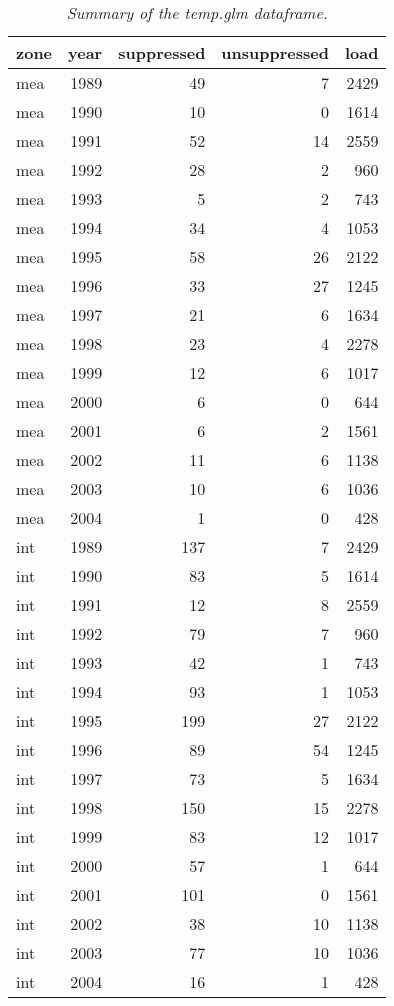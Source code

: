 \begin{spacing}{1.5}
\begin{center}
\begin{table}[ht]
\begin{center}
\begin{tabular}{|l|r|r|r|r|}
  \hline
zone & year & suppressed & unsuppressed & load \\ 
  \hline
mea & 1989 & 49 & 7 & 2429 \\ 
  mea & 1990 & 10 & 0 & 1614 \\ 
  mea & 1991 & 52 & 14 & 2559 \\ 
  mea & 1992 & 28 & 2 & 960 \\ 
  mea & 1993 & 5 & 2 & 743 \\ 
  mea & 1994 & 34 & 4 & 1053 \\ 
  mea & 1995 & 58 & 26 & 2122 \\ 
  mea & 1996 & 33 & 27 & 1245 \\ 
  mea & 1997 & 21 & 6 & 1634 \\ 
  mea & 1998 & 23 & 4 & 2278 \\ 
  mea & 1999 & 12 & 6 & 1017 \\ 
  mea & 2000 & 6 & 0 & 644 \\ 
  mea & 2001 & 6 & 2 & 1561 \\ 
  mea & 2002 & 11 & 6 & 1138 \\ 
  mea & 2003 & 10 & 6 & 1036 \\ 
  mea & 2004 & 1 & 0 & 428 \\ 
  int & 1989 & 137 & 7 & 2429 \\ 
  int & 1990 & 83 & 5 & 1614 \\ 
  int & 1991 & 12 & 8 & 2559 \\ 
  int & 1992 & 79 & 7 & 960 \\ 
  int & 1993 & 42 & 1 & 743 \\ 
  int & 1994 & 93 & 1 & 1053 \\ 
  int & 1995 & 199 & 27 & 2122 \\ 
  int & 1996 & 89 & 54 & 1245 \\ 
  int & 1997 & 73 & 5 & 1634 \\ 
  int & 1998 & 150 & 15 & 2278 \\ 
  int & 1999 & 83 & 12 & 1017 \\ 
  int & 2000 & 57 & 1 & 644 \\ 
  int & 2001 & 101 & 0 & 1561 \\ 
  int & 2002 & 38 & 10 & 1138 \\ 
  int & 2003 & 77 & 10 & 1036 \\ 
  int & 2004 & 16 & 1 & 428 \\ 
   \hline
\end{tabular}
\caption[Summary of the temp.glm dataframe.]{\emph{Summary of the temp.glm dataframe.}}
\label{tab2}
\end{center}
\end{table}\end{center}


\end{spacing}
